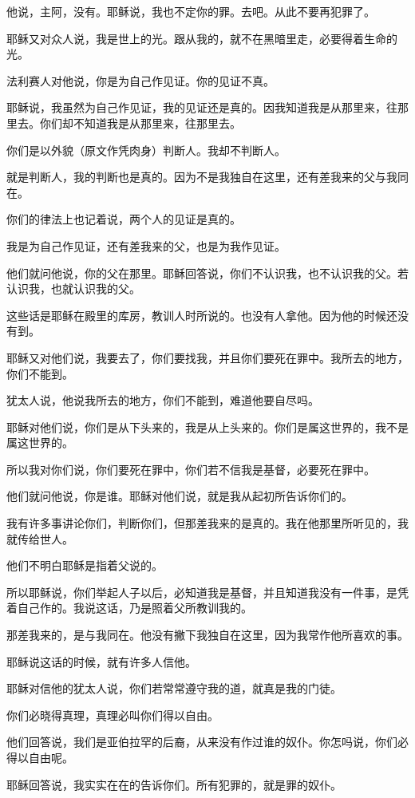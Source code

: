 \documentclass[12pt,oneside]{book}
\begin{document}
他说，主阿，没有。耶稣说，我也不定你的罪。去吧。从此不要再犯罪了。

耶稣又对众人说，我是世上的光。跟从我的，就不在黑暗里走，必要得着生命的光。

法利赛人对他说，你是为自己作见证。你的见证不真。

耶稣说，我虽然为自己作见证，我的见证还是真的。因我知道我是从那里来，往那里去。你们却不知道我是从那里来，往那里去。

你们是以外貌（原文作凭肉身）判断人。我却不判断人。

就是判断人，我的判断也是真的。因为不是我独自在这里，还有差我来的父与我同在。

你们的律法上也记着说，两个人的见证是真的。

我是为自己作见证，还有差我来的父，也是为我作见证。

他们就问他说，你的父在那里。耶稣回答说，你们不认识我，也不认识我的父。若认识我，也就认识我的父。

这些话是耶稣在殿里的库房，教训人时所说的。也没有人拿他。因为他的时候还没有到。

耶稣又对他们说，我要去了，你们要找我，并且你们要死在罪中。我所去的地方，你们不能到。

犹太人说，他说我所去的地方，你们不能到，难道他要自尽吗。

耶稣对他们说，你们是从下头来的，我是从上头来的。你们是属这世界的，我不是属这世界的。

所以我对你们说，你们要死在罪中，你们若不信我是基督，必要死在罪中。

他们就问他说，你是谁。耶稣对他们说，就是我从起初所告诉你们的。

我有许多事讲论你们，判断你们，但那差我来的是真的。我在他那里所听见的，我就传给世人。

他们不明白耶稣是指着父说的。

所以耶稣说，你们举起人子以后，必知道我是基督，并且知道我没有一件事，是凭着自己作的。我说这话，乃是照着父所教训我的。

那差我来的，是与我同在。他没有撇下我独自在这里，因为我常作他所喜欢的事。

耶稣说这话的时候，就有许多人信他。

耶稣对信他的犹太人说，你们若常常遵守我的道，就真是我的门徒。

你们必晓得真理，真理必叫你们得以自由。

他们回答说，我们是亚伯拉罕的后裔，从来没有作过谁的奴仆。你怎吗说，你们必得以自由呢。

耶稣回答说，我实实在在的告诉你们。所有犯罪的，就是罪的奴仆。
\end{document}
